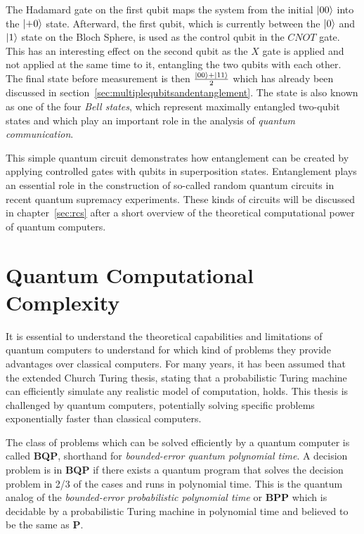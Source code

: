 The Hadamard gate on the first qubit maps the system from the initial $\Ket{00}$
into the $\Ket{+0}$ state. Afterward, the first qubit, which is currently
between the $\Ket{0}$ and $\Ket{1}$ state on the Bloch Sphere, is used as the
control qubit in the $CNOT$ gate. This has an interesting effect on the second qubit
as the $X$ gate is applied and not applied at the same time to it, entangling
the two qubits with each other. The final state before measurement is then
$\frac{\Ket{00} + \Ket{11}}{2}$ which has already been discussed in section~\ref{sec:multiplequbitsandentanglement}.
The state is also known as one of the four \textit{Bell states}, which represent maximally
entangled two-qubit states and which play an important role in the analysis of
\textit{quantum communication}.

This simple quantum circuit demonstrates how entanglement can be created by applying controlled gates with qubits in superposition states.
Entanglement plays an essential role in the construction of so-called random
quantum circuits in recent quantum supremacy experiments. These kinds of circuits will
be discussed in chapter~\ref{sec:rcs} after a short overview of the theoretical
computational power of quantum computers.


\section{Quantum Computational Complexity}

It is essential to understand the theoretical capabilities and limitations of quantum computers to understand for which kind of problems
they provide advantages over classical computers. For many years, it has been
assumed that the extended Church Turing thesis, stating that a probabilistic
Turing machine can efficiently simulate any realistic model of computation,
holds. This thesis is challenged by quantum computers, potentially solving specific problems exponentially faster than classical computers.

The class of problems which can be solved efficiently by a quantum
computer is called \textbf{BQP}, shorthand for \textit{bounded-error quantum
  polynomial time}. A decision problem is in \textbf{BQP} if there exists a quantum
program that solves the decision problem in 2/3 of the cases and runs in
polynomial time. This is the quantum analog of the \textit{bounded-error
  probabilistic polynomial time} or \textbf{BPP} which is decidable by a
probabilistic Turing machine in polynomial time and believed to be the same as
\textbf{P}.

